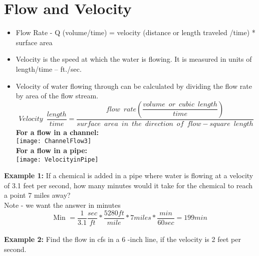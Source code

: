 \section{Flow and Velocity}
\begin{itemize}
\item Flow Rate - Q (volume/time) = velocity (distance or length traveled /time) * surface area
\item Velocity is the speed at which the water is flowing.  It is measured in units of length/time – ft./sec.
\item Velocity of water flowing through can be calculated by dividing the flow rate by area of the flow stream.\\
\vspace{0.5cm}
$$Velocity \enspace \dfrac{length}{time}= \dfrac{flow \enspace rate(\dfrac{volume \enspace or \enspace cubic \enspace length}{time})}{surface \enspace area \enspace in \enspace the \enspace direction \enspace of \enspace flow-square \enspace length}$$
\vspace{0.5cm}
\textbf{For a flow in a channel:}\\
\vspace{0.5cm}
\texttt{[image: ChannelFlow3]}\\

\textbf{For a flow in a pipe:}\\
\vspace{0.5cm}
\texttt{[image: VelocityinPipe]}\\
\vspace{0.5cm}
\end{itemize}

\textbf{Example 1:} If a chemical is added in a pipe where water is flowing at a velocity of 3.1 feet per second, how many minutes would it take for the chemical to reach a point 7 miles away?  \\

Note - we want the answer in minutes\\

$$\textrm{Min } = \dfrac{1}{3.1}\dfrac{sec}{ft}*\dfrac{5280ft}{mile}*7 miles*\dfrac{min}{60 sec} = \boxed{199 min}$$
\\

\textbf{Example 2:} Find the flow in cfs in a 6 -inch line, if the velocity is 2 feet per second.

